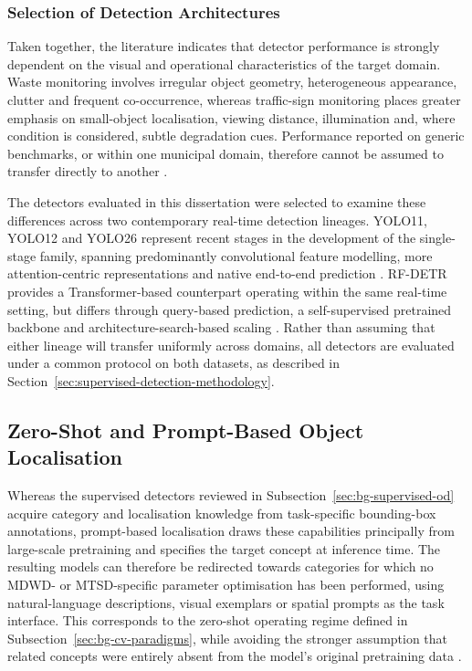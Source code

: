 \subsubsection{Selection of Detection Architectures}
\label{sec:bg-selection-od}
Taken together, the literature indicates that detector performance is strongly dependent on the visual and operational characteristics of the target domain. Waste monitoring involves irregular object geometry, heterogeneous appearance, clutter and frequent co-occurrence, whereas traffic-sign monitoring places greater emphasis on small-object localisation, viewing distance, illumination and, where condition is considered, subtle degradation cues. Performance reported on generic benchmarks, or within one municipal domain, therefore cannot be assumed to transfer directly to another \cite{robinson2026rfdetrneuralarchitecturesearch,pandey2026signcondition}.

The detectors evaluated in this dissertation were selected to examine these differences across two contemporary real-time detection lineages. \gls{YOLO}11, \gls{YOLO}12 and \gls{YOLO}26 represent recent stages in the development of the single-stage family, spanning predominantly convolutional feature modelling, more attention-centric representations and native end-to-end prediction \cite{yolo11,tian2025yolov12,jocher2026yolo26}. \gls{RF-DETR} provides a Transformer-based counterpart operating within the same real-time setting, but differs through query-based prediction, a self-supervised pretrained backbone and architecture-search-based scaling \cite{robinson2026rfdetrneuralarchitecturesearch}. Rather than assuming that either lineage will transfer uniformly across domains, all detectors are evaluated under a common protocol on both datasets, as described in Section~\ref{sec:supervised-detection-methodology}.

\subsection{Zero-Shot and Prompt-Based Object Localisation}
\label{sec:bg-zero-shot}
Whereas the supervised detectors reviewed in Subsection~\ref{sec:bg-supervised-od} acquire category and localisation knowledge from task-specific bounding-box annotations, prompt-based localisation draws these capabilities principally from large-scale pretraining and specifies the target concept at inference time. The resulting models can therefore be redirected towards categories for which no \gls{MDWD}- or \gls{MTSD}-specific parameter optimisation has been performed, using natural-language descriptions, visual exemplars or spatial prompts as the task interface. This corresponds to the zero-shot operating regime defined in Subsection~\ref{sec:bg-cv-paradigms}, while avoiding the stronger assumption that related concepts were entirely absent from the model's original pretraining data \cite{radford2021learning,zhang2024vlmsurvey,zhu2024openvocabulary}.

